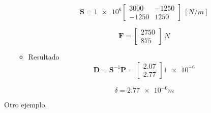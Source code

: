 \begin{example}
\begin{itemize}
\begin{itemize}
$$
\mathbf{S} = \num{1e6} \left[\begin{array}{rr}
	3000 & -1250 \\ -1250 & 1250
\end{array}\right] \ [\unit{N/m}]
$$

$$
\mathbf{F} = \begin{bmatrix}
	2750 \\ 875
\end{bmatrix} \ \unit{N}
$$

\item Resultado
$$
\mathbf{D} = \mathbf{S}^{-1} \mathbf{P} = \begin{bmatrix}
	2.07 \\ 2.77
\end{bmatrix} \num{1e-6}
$$

$$
\boxed{\delta = \num{2.77e-6} \unit{m}}
$$
\end{itemize}
\end{itemize}
\end{example}
Otro ejemplo.
